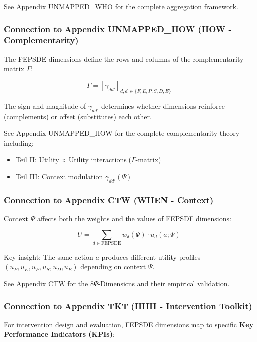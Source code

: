 See Appendix UNMAPPED_WHO for the complete aggregation framework.

\subsubsection{Connection to Appendix UNMAPPED_HOW (HOW - Complementarity)}

The FEPSDE dimensions define the rows and columns of the complementarity 
matrix $\Gamma$:

\begin{equation}
\Gamma = [\gamma_{dd'}]_{d, d' \in \{F, E, P, S, D, E\}}
\end{equation}

The sign and magnitude of $\gamma_{dd'}$ determines whether dimensions 
reinforce (complements) or offset (substitutes) each other.

See Appendix UNMAPPED_HOW for the complete complementarity theory including:
\begin{itemize}
    \item Teil II: Utility $\times$ Utility interactions ($\Gamma$-matrix)
    \item Teil III: Context modulation $\gamma_{dd'}(\Psi)$
\end{itemize}

\subsubsection{Connection to Appendix CTW (WHEN - Context)}

Context $\Psi$ affects both the weights and the values of FEPSDE dimensions:

\begin{equation}
U = \sum_{d \in \text{FEPSDE}} w_d(\Psi) \cdot u_d(a; \Psi)
\end{equation}

Key insight: The same action $a$ produces different utility profiles 
$(u_F, u_E, u_P, u_S, u_D, u_E)$ depending on context $\Psi$.

See Appendix CTW for the 8$\Psi$-Dimensions and their empirical validation.

\subsubsection{Connection to Appendix TKT (HHH - Intervention Toolkit)}

For intervention design and evaluation, FEPSDE dimensions map to specific
\textbf{Key Performance Indicators (KPIs)}:

